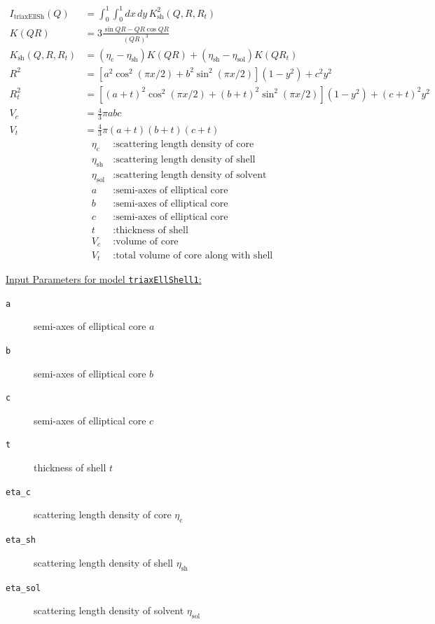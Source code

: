\begin{align}
I_\text{triaxEllSh}(Q) &= \int^1_0 \int ^1_0 dx\,dy\, K_\text{sh}^2(Q,R,R_t)\\
K(QR)         &= 3 \frac{\sin QR - QR\cos QR}{(QR)^3} \\
K_\text{sh}(Q,R,R_t) &= \left(\eta_\text{c}-\eta_\text{sh}\right)K(QR)+\left(\eta_\text{sh}-\eta_\text{sol}\right)K(QR_t) \\
R^2 &= \left[a^2\cos^2\left(\pi x/2\right) + b^2\sin^2\left(\pi x/2\right)\right](1-y^2)+c^2y^2 \nonumber \\
R_t^2 &= \left[(a+t)^2\cos^2\left(\pi x/2\right) + (b+t)^2\sin^2\left(\pi x/2\right)\right](1-y^2)+(c+t)^2y^2
\nonumber \\
V_c &= \frac{4}{3}\pi abc \nonumber \\
V_t &= \frac{4}{3}\pi (a+t)(b+t)(c+t) \nonumber
\end{align}
\begin{align}
\eta_\text{c} &: \text{scattering length density of core} \nonumber \\
\eta_\text{sh} &: \text{scattering length density of shell} \nonumber \\
\eta_\text{sol} &: \text{scattering length density of solvent} \nonumber \\
a &: \text{semi-axes of elliptical core} \nonumber \\
b &: \text{semi-axes of elliptical core} \nonumber \\
c &: \text{semi-axes of elliptical core} \nonumber \\
t &: \text{thickness of shell} \nonumber \\
V_c &: \text{volume of core} \nonumber \\
V_t &: \text{total volume of core along with shell} \nonumber
\end{align}

\vspace{3cm}
\underline{Input Parameters for model \texttt{triaxEllShell1}:}
\begin{description}
\item[\texttt{a}] semi-axes of elliptical core $a$
\item[\texttt{b}] semi-axes of elliptical core $b$
\item[\texttt{c}] semi-axes of elliptical core $c$
\item[\texttt{t}] thickness of shell $t$
\item[\texttt{eta\_c}] scattering length density of core $\eta_\text{c}$
\item[\texttt{eta\_sh}] scattering length density of shell $\eta_\text{sh}$
\item[\texttt{eta\_sol}] scattering length density of solvent $\eta_\text{sol}$
\end{description}

